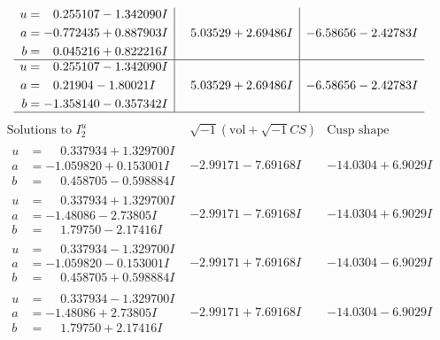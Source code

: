 \documentclass[1p]{elsarticle_modified}
\theoremstyle{definition}
\newcommand{\I}{\sqrt{-1}}
\begin{document}
$$\begin{array}{c|c|c}
\begin{aligned}
u &= \phantom{-}0.255107 - 1.342090 I \\
a &= -0.772435 + 0.887903 I \\
b &= \phantom{-}0.045216 + 0.822216 I\end{aligned}
 & \phantom{-}5.03529 + 2.69486 I & -6.58656 - 2.42783 I \\ \hline\begin{aligned}
u &= \phantom{-}0.255107 - 1.342090 I \\
a &= \phantom{-}0.21904 - 1.80021 I \\
b &= -1.358140 - 0.357342 I\end{aligned}
 & \phantom{-}5.03529 + 2.69486 I & -6.58656 - 2.42783 I\\
 \hline 
 \end{array}$$\newpage$$\begin{array}{c|c|c}  
\text{Solutions to }I^u_{2}& \I (\text{vol} + \sqrt{-1}CS) & \text{Cusp shape}\\
 \hline 
\begin{aligned}
u &= \phantom{-}0.337934 + 1.329700 I \\
a &= -1.059820 + 0.153001 I \\
b &= \phantom{-}0.458705 - 0.598884 I\end{aligned}
 & -2.99171 - 7.69168 I & -14.0304 + 6.9029 I \\ \hline\begin{aligned}
u &= \phantom{-}0.337934 + 1.329700 I \\
a &= -1.48086 - 2.73805 I \\
b &= \phantom{-}1.79750 - 2.17416 I\end{aligned}
 & -2.99171 - 7.69168 I & -14.0304 + 6.9029 I \\ \hline\begin{aligned}
u &= \phantom{-}0.337934 - 1.329700 I \\
a &= -1.059820 - 0.153001 I \\
b &= \phantom{-}0.458705 + 0.598884 I\end{aligned}
 & -2.99171 + 7.69168 I & -14.0304 - 6.9029 I \\ \hline\begin{aligned}
u &= \phantom{-}0.337934 - 1.329700 I \\
a &= -1.48086 + 2.73805 I \\
b &= \phantom{-}1.79750 + 2.17416 I\end{aligned}
 & -2.99171 + 7.69168 I & -14.0304 - 6.9029 I \\ \hline\begin{aligned}

\end{aligned}
\end{array}$$
\end{document}
